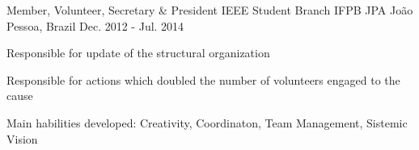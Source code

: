 \begin{cventries}
\cventry
  {Member, Volunteer, Secretary \& President} %
  {IEEE Student Branch IFPB JPA} %
  {João Pessoa, Brazil} %
  {Dec. 2012 - Jul. 2014} %
  {
    \begin{cvitems} %
        \item{Responsible for update of the structural organization}
        \item{Responsible for actions which doubled the number of volunteers engaged to the cause}
        \item{Main habilities developed: Creativity, Coordinaton, Team Management, Sistemic Vision}
    \end{cvitems}
  }
%
\end{cventries}
